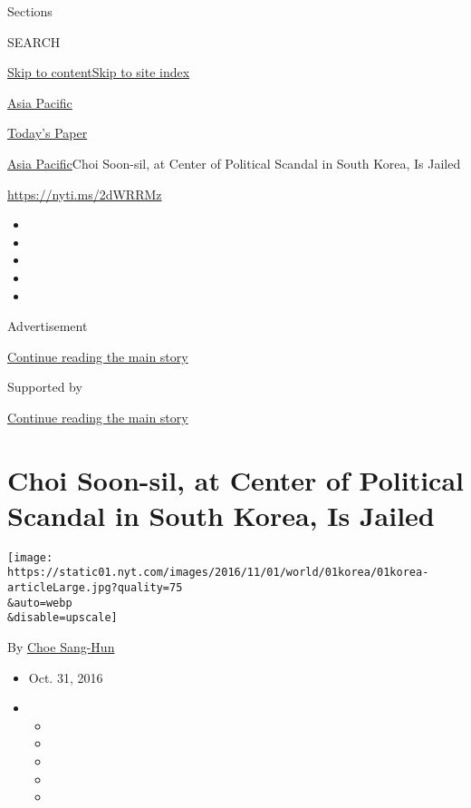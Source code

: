 Sections

SEARCH

\protect\hyperlink{site-content}{Skip to
content}\protect\hyperlink{site-index}{Skip to site index}

\href{https://www.nytimes.com/section/world/asia}{Asia Pacific}

\href{https://myaccount.nytimes.com/auth/login?response_type=cookie\&client_id=vi}{}

\href{https://www.nytimes.com/section/todayspaper}{Today's Paper}

\href{/section/world/asia}{Asia Pacific}\textbar{}Choi Soon-sil, at
Center of Political Scandal in South Korea, Is Jailed

\url{https://nyti.ms/2dWRRMz}

\begin{itemize}
\item
\item
\item
\item
\item
\end{itemize}

Advertisement

\protect\hyperlink{after-top}{Continue reading the main story}

Supported by

\protect\hyperlink{after-sponsor}{Continue reading the main story}

\hypertarget{choi-soon-sil-at-center-of-political-scandal-in-south-korea-is-jailed}{%
\section{Choi Soon-sil, at Center of Political Scandal in South Korea,
Is
Jailed}\label{choi-soon-sil-at-center-of-political-scandal-in-south-korea-is-jailed}}

\texttt{[image: https://static01.nyt.com/images/2016/11/01/world/01korea/01korea-articleLarge.jpg?quality=75\\\&auto=webp\\\&disable=upscale]}

By \href{http://www.nytimes.com/by/choe-sang-hun}{Choe Sang-Hun}

\begin{itemize}
\item
  Oct. 31, 2016
\item
  \begin{itemize}
  \item
  \item
  \item
  \item
  \item
  \end{itemize}
\end{itemize}

